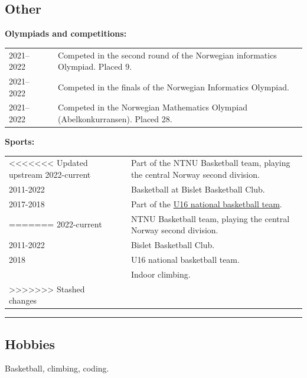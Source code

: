 \documentclass[10pt]{article}
\newlength{\cw}
\newlength{\cwl}
\begin{document}
\newpage

\subsection*{Other}
\textbf{Olympiads and competitions:}

\begin{tabular}{p{\cw} @{:}l p{\cwl}}
  2021--2022 & & Competed in the second round of the Norwegian informatics Olympiad. Placed 9.\\
  2021--2022 & & Competed in the finals of the Norwegian Informatics Olympiad.\\
  2021--2022 & & Competed in the Norwegian Mathematics Olympiad (Abelkonkurransen). Placed 28.\\
\end{tabular}

\textbf{Sports:}

\begin{tabular}{p{\cw} @{:}l p{\cwl}}
<<<<<<< Updated upstream
  2022-current & & Part of the NTNU Basketball team, playing the central Norway second division.\\
  2011-2022 & & Basketball at Bislet Basketball Club. \\
  2017-2018 & & Part of the \href{https://www.basket.no/landslag/u16-menn/}{U16 national basketball team}. \\
=======
  2022-current & & NTNU Basketball team, playing the central Norway second division.\\
  2011-2022 & & Bislet Basketball Club.\\
  2018 & & U16 national basketball team. \\
   & & Indoor climbing. \\
>>>>>>> Stashed changes
\end{tabular}
\vspace{0.1cm}
\hrule
\vspace{0.1cm}

\subsection*{Hobbies}
Basketball, climbing, coding. 
\end{document}
